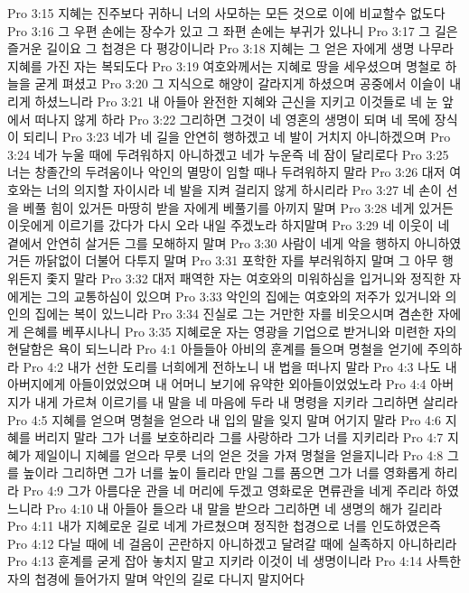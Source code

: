 Pro 3:15  지혜는 진주보다 귀하니 너의 사모하는 모든 것으로 이에 비교할수 없도다
Pro 3:16  그 우편 손에는 장수가 있고 그 좌편 손에는 부귀가 있나니
Pro 3:17  그 길은 즐거운 길이요 그 첩경은 다 평강이니라
Pro 3:18  지혜는 그 얻은 자에게 생명 나무라 지혜를 가진 자는 복되도다
Pro 3:19  여호와께서는 지혜로 땅을 세우셨으며 명철로 하늘을 굳게 펴셨고
Pro 3:20  그 지식으로 해양이 갈라지게 하셨으며 공중에서 이슬이 내리게 하셨느니라
Pro 3:21  내 아들아 완전한 지혜와 근신을 지키고 이것들로 네 눈 앞에서 떠나지 않게 하라
Pro 3:22  그리하면 그것이 네 영혼의 생명이 되며 네 목에 장식이 되리니
Pro 3:23  네가 네 길을 안연히 행하겠고 네 발이 거치지 아니하겠으며
Pro 3:24  네가 누울 때에 두려워하지 아니하겠고 네가 누운즉 네 잠이 달리로다
Pro 3:25  너는 창졸간의 두려움이나 악인의 멸망이 임할 때나 두려워하지 말라
Pro 3:26  대저 여호와는 너의 의지할 자이시라 네 발을 지켜 걸리지 않게 하시리라
Pro 3:27  네 손이 선을 베풀 힘이 있거든 마땅히 받을 자에게 베풀기를 아끼지 말며
Pro 3:28  네게 있거든 이웃에게 이르기를 갔다가 다시 오라 내일 주겠노라 하지말며
Pro 3:29  네 이웃이 네 곁에서 안연히 살거든 그를 모해하지 말며
Pro 3:30  사람이 네게 악을 행하지 아니하였거든 까닭없이 더불어 다투지 말며
Pro 3:31  포학한 자를 부러워하지 말며 그 아무 행위든지 좇지 말라
Pro 3:32  대저 패역한 자는 여호와의 미워하심을 입거니와 정직한 자에게는 그의 교통하심이 있으며
Pro 3:33  악인의 집에는 여호와의 저주가 있거니와 의인의 집에는 복이 있느니라
Pro 3:34  진실로 그는 거만한 자를 비웃으시며 겸손한 자에게 은혜를 베푸시나니
Pro 3:35  지혜로운 자는 영광을 기업으로 받거니와 미련한 자의 현달함은 욕이 되느니라
Pro 4:1  아들들아 아비의 훈계를 들으며 명철을 얻기에 주의하라
Pro 4:2  내가 선한 도리를 너희에게 전하노니 내 법을 떠나지 말라
Pro 4:3  나도 내 아버지에게 아들이었었으며 내 어머니 보기에 유약한 외아들이었었노라
Pro 4:4  아버지가 내게 가르쳐 이르기를 내 말을 네 마음에 두라 내 명령을 지키라 그리하면 살리라
Pro 4:5  지혜를 얻으며 명철을 얻으라 내 입의 말을 잊지 말며 어기지 말라
Pro 4:6  지혜를 버리지 말라 그가 너를 보호하리라 그를 사랑하라 그가 너를 지키리라
Pro 4:7  지혜가 제일이니 지혜를 얻으라 무릇 너의 얻은 것을 가져 명철을 얻을지니라
Pro 4:8  그를 높이라 그리하면 그가 너를 높이 들리라 만일 그를 품으면 그가 너를 영화롭게 하리라
Pro 4:9  그가 아름다운 관을 네 머리에 두겠고 영화로운 면류관을 네게 주리라 하였느니라
Pro 4:10  내 아들아 들으라 내 말을 받으라 그리하면 네 생명의 해가 길리라
Pro 4:11  내가 지혜로운 길로 네게 가르쳤으며 정직한 첩경으로 너를 인도하였은즉
Pro 4:12  다닐 때에 네 걸음이 곤란하지 아니하겠고 달려갈 때에 실족하지 아니하리라
Pro 4:13  훈계를 굳게 잡아 놓치지 말고 지키라 이것이 네 생명이니라
Pro 4:14  사특한 자의 첩경에 들어가지 말며 악인의 길로 다니지 말지어다
